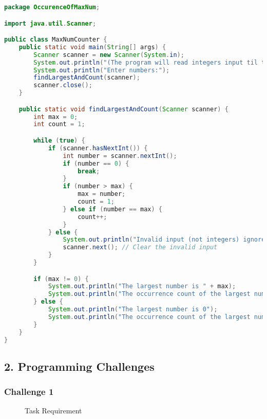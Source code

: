 \documentclass{article}
\begin{document}
\begin{lstlisting}[language=Java, caption=MaxNumCounter.java]
package OccurenceOfMaxNum;

import java.util.Scanner;

public class MaxNumCounter {
    public static void main(String[] args) {
        Scanner scanner = new Scanner(System.in);
        System.out.println("(The program will read integers input til the first 0)");
        System.out.println("Enter numbers:");
        findLargestAndCount(scanner);
        scanner.close();
    }

    public static void findLargestAndCount(Scanner scanner) {
        int max = 0;
        int count = 1;

        while (true) {
            if (scanner.hasNextInt()) {
                int number = scanner.nextInt();
                if (number == 0) {
                    break;
                }
                if (number > max) {
                    max = number;
                    count = 1;
                } else if (number == max) {
                    count++;
                }
            } else {
                System.out.println("Invalid input (not integers) ignored.");
                scanner.next(); // Clear the invalid input
            }
        }

        if (max != 0) {
            System.out.println("The largest number is " + max);
            System.out.println("The occurrence count of the largest number is " + count);
        } else {
            System.out.println("The largest number is 0");
            System.out.println("The occurrence count of the largest number is 1");
        }
    }
}
\end{lstlisting}

\subsection*{2. Programming Challenges}

\subsubsection*{Challenge 1}

\begin{figure}[h]
    \centering
    \caption{Task Requirement}
\end{figure}
\end{document}

